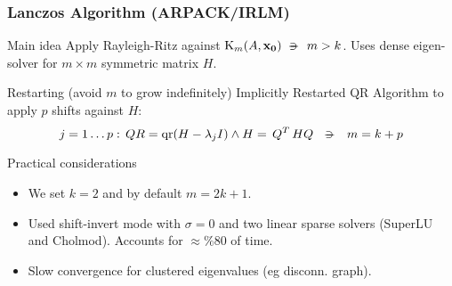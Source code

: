  \begin{frame}
  \frametitle{Lanczos Algorithm (ARPACK/IRLM)}
  \begin{block}{Main idea}
    Apply Rayleigh-Ritz against
    $\Krylov{A}{\vec{x_0}}{m} \suchthat m > k$. Uses dense
    eigen-solver for $m \times m$ symmetric matrix $H$.
  \end{block}
  \begin{block}{Restarting (avoid $m$ to grow indefinitely)}
    Implicitly Restarted QR Algorithm to apply $p$ shifts against $H$:
    \[
    j=1 \ldots p:\, QR = \func{qr}(H - \lambda_j I) \land H = \trans{Q}HQ
    \ds{\suchthat}
    m = k + p
    \joinbelow{0}
    \]    
  \end{block}
  \begin{block}{Practical considerations}
    \begin{itemize}
    \item We set $k=2$ and by default $m=2k+1$.
    \item Used shift-invert mode with $\sigma=0$ and two linear sparse
      solvers (SuperLU and Cholmod). Accounts for $\approx \%80$ of time.
    \item Slow convergence for clustered eigenvalues (eg disconn. graph).
    \end{itemize}
  \end{block}
\end{frame}
